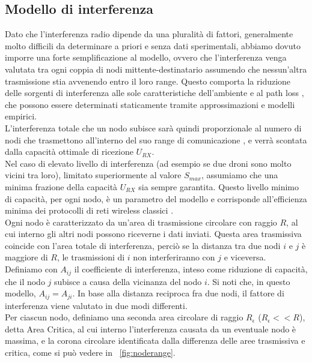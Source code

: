 \subsection{Modello di interferenza}
Dato che l'interferenza radio dipende da una pluralità di fattori, generalmente molto difficili da determinare a priori e senza dati sperimentali, abbiamo dovuto imporre una forte semplificazione al modello, ovvero che l'interferenza venga valutata tra ogni coppia di nodi mittente-destinatario assumendo che nessun'altra trasmissione stia avvenendo entro il loro range. Questo comporta la riduzione delle sorgenti di interferenza alle sole caratteristiche dell'ambiente e al path loss \cite{Killat:2009:EMP:1554307.1554311}, che possono essere determinati staticamente tramite approssimazioni e modelli empirici. \\
L'interferenza totale che un nodo subisce sarà quindi proporzionale al numero di nodi che trasmettono all'interno del suo range di comunicazione \cite{moaveni2005low}, e verrà scontata dalla capacità ottimale di ricezione $U_{RX}$. \\
Nel caso di elevato livello di interferenza (ad esempio se due droni sono molto vicini tra loro), limitato superiormente al valore $S_{max}$, assumiamo che una minima frazione della capacità $U_{RX}$ sia sempre garantita. Questo livello minimo di capacità, per ogni nodo, è un parametro del modello e corrisponde all'efficienza minima dei protocolli di reti wireless classici \cite{tanenbaum2003computer}. \\
Ogni nodo è caratterizzato da un'area di trasmissione circolare con raggio $R$, al cui interno gli altri nodi possono riceverne i dati inviati. Questa area trasmissiva coincide con l'area totale di interferenza, perciò se la distanza tra due nodi $i$ e $j$ è maggiore di $R$, le trasmissioni di $i$ non interferiranno con $j$ e viceversa.  \\
Definiamo con $A_{ij}$ il coefficiente di interferenza, inteso come riduzione di capacità, che il nodo $j$ subisce a causa della vicinanza del nodo $i$. Si noti che, in questo modello, $A_{ij} = A_{ji}$.
In base alla distanza reciproca fra due nodi, il fattore di interferenza viene valutato in due modi differenti. \\
Per ciascun nodo, definiamo una seconda area circolare di raggio $R_\epsilon$ ($R_\epsilon << R$), detta Area Critica, al cui interno l'interferenza causata da un eventuale nodo è massima, e la corona circolare identificata dalla differenza delle aree trasmissiva e critica, come si può vedere in \figurename\ \ref{fig:noderange}. \\

